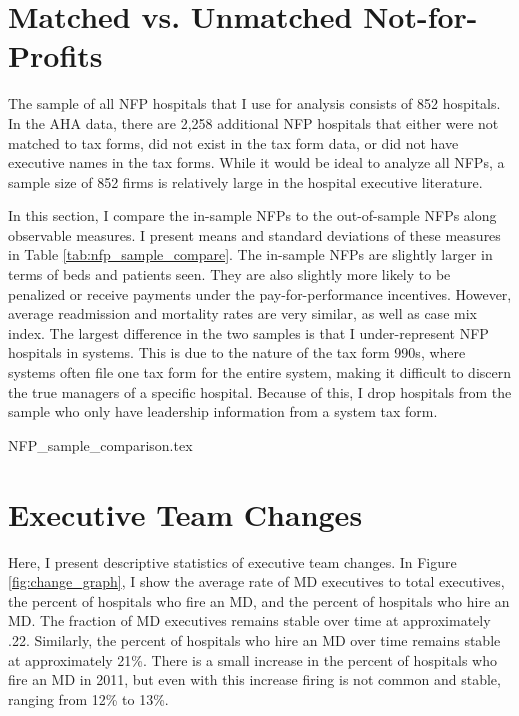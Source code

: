 \documentclass[12pt]{article}
\begin{document}
\section{Matched vs. Unmatched Not-for-Profits}\label{app:matched}

The sample of all NFP hospitals that I use for analysis consists of 852 hospitals. In the AHA data, there are 2,258 additional NFP hospitals that either were not matched to tax forms, did not exist in the tax form data, or did not have executive names in the tax forms. While it would be ideal to analyze all NFPs, a sample size of 852 firms is relatively large in the hospital executive literature. 

In this section, I compare the in-sample NFPs to the out-of-sample NFPs along observable measures. I present means and standard deviations of these measures in Table \ref{tab:nfp_sample_compare}. The in-sample NFPs are slightly larger in terms of beds and patients seen. They are also slightly more likely to be penalized or receive payments under the pay-for-performance incentives. However, average readmission and mortality rates are very similar, as well as case mix index. The largest difference in the two samples is that I under-represent NFP hospitals in systems. This is due to the nature of the tax form 990s, where systems often file one tax form for the entire system, making it difficult to discern the true managers of a specific hospital. Because of this, I drop hospitals from the sample who only have leadership information from a system tax form. 

{NFP_sample_comparison.tex}


\section{Executive Team Changes}\label{app:changes}

Here, I present descriptive statistics of executive team changes. In Figure \ref{fig:change_graph}, I show the average rate of MD executives to total executives, the percent of hospitals who fire an MD, and the percent of hospitals who hire an MD. The fraction of MD executives remains stable over time at approximately .22. Similarly, the percent of hospitals who hire an MD over time remains stable at approximately 21\%. There is a small increase in the percent of hospitals who fire an MD in 2011, but even with this increase firing is not common and stable, ranging from 12\% to 13\%. 
\end{document}
